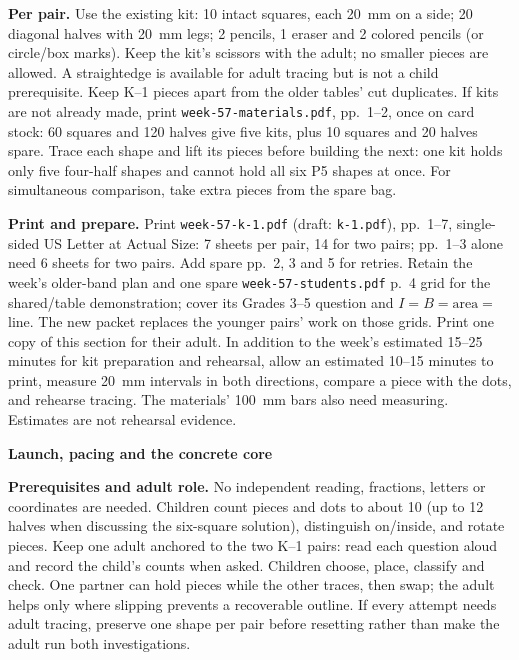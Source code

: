 \documentclass[11pt]{article}
\newcommand{\head}[1]{\par\textbf{\large #1}\par}
\begin{document}
\textbf{Per pair.} Use the existing kit: 10 intact squares, each 20~mm on a side; 20 diagonal halves with 20~mm legs; 2 pencils, 1 eraser and 2 colored pencils (or circle/box marks). Keep the kit's scissors with the adult; no smaller pieces are allowed. A straightedge is available for adult tracing but is not a child prerequisite. Keep K--1 pieces apart from the older tables' cut duplicates. If kits are not already made, print \texttt{week-57-materials.pdf}, pp.~1--2, once on card stock: 60 squares and 120 halves give five kits, plus 10 squares and 20 halves spare. Trace each shape and lift its pieces before building the next: one kit holds only five four-half shapes and cannot hold all six P5 shapes at once. For simultaneous comparison, take extra pieces from the spare bag.

\textbf{Print and prepare.} Print \texttt{week-57-k-1.pdf} (draft: \texttt{k-1.pdf}), pp.~1--7, single-sided US Letter at Actual Size: 7 sheets per pair, 14 for two pairs; pp.~1--3 alone need 6 sheets for two pairs. Add spare pp.~2, 3 and 5 for retries. Retain the week's older-band plan and one spare \texttt{week-57-students.pdf} p.~4 grid for the shared/table demonstration; cover its Grades 3--5 question and $I=B=\text{area}=$ line. The new packet replaces the younger pairs' work on those grids. Print one copy of this section for their adult. In addition to the week's estimated 15--25 minutes for kit preparation and rehearsal, allow an estimated 10--15 minutes to print, measure 20~mm intervals in both directions, compare a piece with the dots, and rehearse tracing. The materials' 100~mm bars also need measuring. Estimates are not rehearsal evidence.
\newpage
\head{Launch, pacing and the concrete core}
\textbf{Prerequisites and adult role.} No independent reading, fractions, letters or coordinates are needed. Children count pieces and dots to about 10 (up to 12 halves when discussing the six-square solution), distinguish on/inside, and rotate pieces. Keep one adult anchored to the two K--1 pairs: read each question aloud and record the child's counts when asked. Children choose, place, classify and check. One partner can hold pieces while the other traces, then swap; the adult helps only where slipping prevents a recoverable outline. If every attempt needs adult tracing, preserve one shape per pair before resetting rather than make the adult run both investigations.
\end{document}
